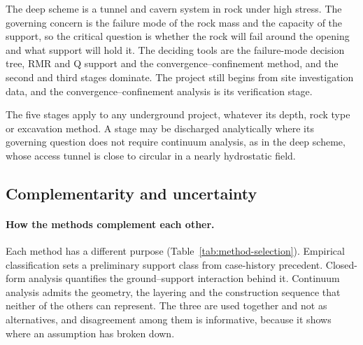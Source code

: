 The deep scheme is a tunnel and cavern system in rock under high stress. The
governing concern is the failure mode of the rock mass and the capacity of
the support, so the critical question is whether the rock will fail around
the opening and what support will hold it. The deciding tools are the
failure-mode decision tree, RMR and Q support and the convergence--confinement
method, and the second and third stages dominate. The project still begins
from site investigation data, and the convergence--confinement analysis
is its verification stage.

The five stages apply to any underground project, whatever its depth, rock
type or excavation method. A stage may be discharged analytically where its
governing question does not require continuum analysis, as in the deep
scheme, whose access tunnel is close to circular in a nearly hydrostatic
field.

\subsection{Complementarity and uncertainty}
\label{sec:complementarity-and-uncertainty}

\paragraph{How the methods complement each other.}
Each method has a different purpose
(Table~\ref{tab:method-selection}). Empirical classification sets a
preliminary support class from case-history precedent. Closed-form analysis
quantifies the ground--support interaction behind it. Continuum analysis
admits the geometry, the layering and the construction sequence that neither
of the others can represent. The three are used together and not as
alternatives, and disagreement among them is informative, because it shows
where an assumption has broken down.

